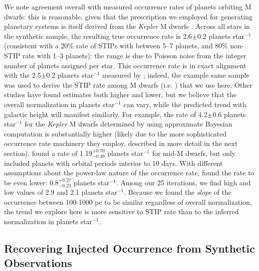 \documentclass[twocolumn]{aastex631}
\begin{document}
We note agreement overall with measured occurrence rates of planets orbiting M dwarfs: this is reasonable, given that the prescription we employed for generating planetary systems is itself derived from the \textit{Kepler} M dwarfs \citep{Ballard16}. Across all stars in the synthetic sample, the resulting true occurrence rate is 2.6$\pm0.2$ planets star$^{-1}$ (consistent with a 20\% rate of STIPs with between 5--7 planets, and 80\% non-STIP rate with 1--3 planets): the range is due to Poisson noise from the integer number of planets assigned per star. This occurrence rate is in exact alignment with the 2.5$\pm$0.2 planets star$^{-1}$ measured by \cite{Dressing15}; indeed, the example same sample was used to derive the STIP rate among M dwarfs (i.e. \citealt{Ballard16}) that we use here. Other studies have found estimates both higher and lower, but we believe that the overall normalization in planets star$^{-1}$ can vary, while the predicted trend with galactic height will manifest similarly. For example, the rate of 4.2$\pm$0.6 planets star$^{-1}$ for the \textit{Kepler} M dwarfs determined by \cite{Hsu20} using approximate Bayesian computation is substantially higher (likely due to the more sophisticated occurrence rate machinery they employ, described in more detail in the next section). \cite{Hardegree19} found a rate of 1.19$^{+0.70}_{-0.49}$ planets star$^{-1}$ for mid-M dwarfs, but only included planets with orbital periods interior to 10 days. With different assumptions about the power-law nature of the occurrence rate, \cite{Bryson20} found the rate to be even lower: 0.8$^{+0.27}_{-0.23}$ planets star$^{-1}$. Among our 25 iterations, we find high and low values of 2.9 and 2.1 planets star$^{-1}$. Because we found the \textit{slope} of the occurrence between 100-1000 pc to be similar regardless of overall normalization, the trend we explore here is more sensitive to STIP rate than to the inferred normalization in planets star$^{-1}$. 

\subsection{Recovering Injected Occurrence from Synthetic Observations}
\label{sec:recover_injected}
\end{document}
